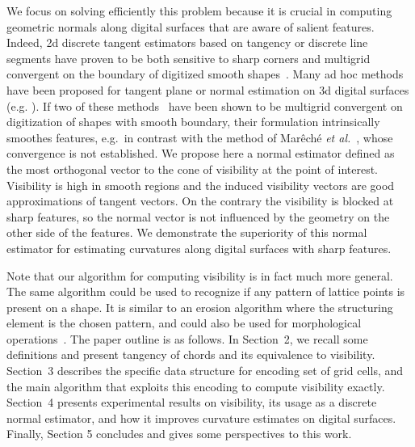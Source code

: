 \documentclass[runningheads]{llncs}
\begin{document}
    We focus on solving efficiently this problem because it is crucial
    in computing geometric normals along digital surfaces that are
    aware of salient features. Indeed, 2d discrete tangent estimators
    based on tangency or discrete line segments have proven to be both
    sensitive to sharp corners and multigrid convergent on the
    boundary of digitized smooth shapes~\cite{feschet:1999-dgci,lachaud:2007-ivc,nguyen:2011-pr}.
    Many ad hoc methods have been proposed for tangent plane or normal
    estimation on 3d digital surfaces
    (e.g. \cite{fourey:2009-cg,charrier:2011-iwcia,Cuel:2014-dgci,Lachaud:2017-lnm,mareche:2024-ispr}).
    If two of these methods~\cite{Cuel:2014-dgci,Lachaud:2017-lnm}
    have been shown to be multigrid convergent on digitization of
    shapes with smooth boundary, their formulation intrinsically
    smoothes features, e.g.\ in contrast with the method of
    Mar{ê}ch{é} \emph{et al.}~\cite{mareche:2024-ispr}, whose
    convergence is not established. We propose here a normal estimator
    defined as the most orthogonal vector to the cone of visibility at
    the point of interest. Visibility is high in smooth regions and
    the induced visibility vectors are good approximations of tangent
    vectors. On the contrary the visibility is blocked at sharp
    features, so the normal vector is not influenced by the
    geometry on the other side of the features. We demonstrate the
    superiority of this normal estimator for estimating curvatures
    along digital surfaces with sharp features.

    Note that our algorithm for computing visibility is in fact much
    more general. The same algorithm could be used to recognize if any
    pattern of lattice points is present on a shape. It is similar to
    an erosion algorithm where the structuring element is the chosen
    pattern, and could also be used for morphological operations~\cite{soille1999morphological}.
    The paper outline is as follows. In Section~2, we recall some
    definitions and present tangency of chords and its equivalence
    to visibility. Section~3 describes the specific data structure
    for encoding set of grid cells, and the main algorithm that
    exploits this encoding to compute visibility exactly. Section~4
    presents experimental results on visibility, its usage as a
    discrete normal estimator, and how it improves curvature estimates
    on digital surfaces. Finally, Section 5 concludes and gives some
    perspectives to this work.
\end{document}
